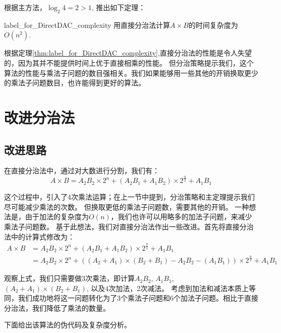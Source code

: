 根据主方法，$\log_2 4  = 2> 1$, 推出如下定理：
\begin{theorem}{}{label_for_DirectDAC_complexity}
    用直接分治法计算$A \times B$的时间复杂度为$O(n^2)$.
\end{theorem}

根据定理\ref{thm:label_for_DirectDAC_complexity},直接分治法的性能是令人失望的，因为其并不能提供时间上优于直接相乘的性能。
但分治策略提示我们，这个算法的性能与乘法子问题的数目强相关。我们如果能够用一些其他的开销换取更少的乘法子问题数目，也许能得到更好的算法。


\newpage
\section{改进分治法}
\subsection{改进思路}
在直接分治法中，通过对大数进行分割，我们有：
\begin{displaymath}
    A \times B = A_2 B_2 \times 2^n + (A_2 B_1 + A_1 B_2) \times 2^{\frac{n}{2}} + A_1 B_1
\end{displaymath}

这个过程中，引入了4次乘法运算；在上一节中提到，分治策略和主定理提示我们尽可能减少乘法的次数。
但换取更低的乘法子问题数，需要其他的开销。
一种想法是，由于加法的复杂度为$O(n)$，我们也许可以用略多的加法子问题，来减少乘法子问题数。
基于此想法，我们对直接分治法作出一些改进。首先将直接分治法中的计算式修改为：
\begin{displaymath}
    \begin{split}
        A \times B
        &= A_2 B_2 \times 2^n + (A_2 B_1 + A_1 B_2) \times 2^{\frac{n}{2}} + A_1 B_1\\
        &= A_2 B_2 \times 2^n + ((A_2 + A_1)\times(B_2 + B_1) - A_2 B_2 - (A_1 B_1)) \times 2^{\frac{n}{2}} + A_1 B_1
    \end{split}
\end{displaymath}

观察上式，我们只需要做3次乘法，即计算$A_2 B_2$, $A_1 B_1$, $(A_2 + A_1)\times(B_2 + B_1)$, 以及4次加法，2次减法。
考虑到加法和减法本质上等同，我们成功地将这一问题转化为了3个乘法子问题和6个加法子问题。相比于直接分治法，我们降低了乘法的数量。

下面给出该算法的伪代码及复杂度分析。
